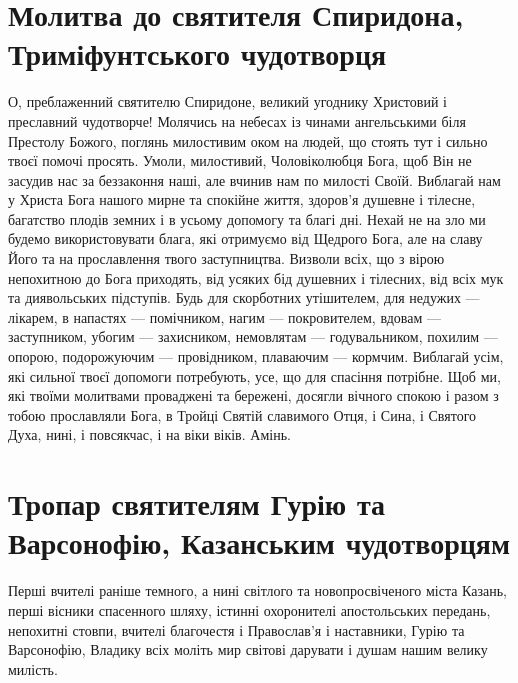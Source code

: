\documentclass[chapters.tex]{subfiles}
\begin{document}
\section{Молитва до святителя Спиридона, Триміфунтського чудотворця}
О, преблаженний святителю Спиридоне, великий угоднику Христовий і преславний чудотворче! Молячись на небесах із чинами ангельськими біля Престолу Божого, поглянь милостивим оком на людей, що стоять тут і сильно твоєї помочі просять. Умоли, милостивий, Чоловіколюбця Бога, щоб Він не засудив нас за беззаконня наші, але вчинив нам по милості Своїй. Виблагай нам у Христа Бога нашого мирне та спокійне життя, здоров’я душевне і тілесне, багатство плодів земних і в усьому допомогу та благі дні. Нехай не на зло ми будемо використовувати блага, які отримуємо від Щедрого Бога, але на славу Його та на прославлення твого заступництва. Визволи всіх, що з вірою непохитною до Бога приходять, від усяких бід душевних і тілесних, від всіх мук та диявольських підступів. Будь для скорботних утішителем, для недужих — лікарем, в напастях — помічником, нагим — покровителем, вдовам — заступником, убогим — захисником, немовлятам — годувальником, похилим — опорою, подорожуючим — провідником, плаваючим — кормчим. Виблагай усім, які сильної твоєї допомоги потребують, усе, що для спасіння потрібне. Щоб ми, які твоїми молитвами проваджені та бережені, досягли вічного спокою і разом з тобою прославляли Бога, в Тройці Святій славимого Отця, і Сина, і Святого Духа, нині, і повсякчас, і на віки віків. Амінь.

\section{Тропар святителям Гурію та Варсонофію, Казанським чудотворцям}
Перші вчителі раніше темного, а нині світлого та новопросвіченого міста Казань, перші вісники спасенного шляху, істинні охоронителі апостольських передань, непохитні стовпи, вчителі благочестя і Православ’я і наставники, Гурію та Варсонофію, Владику всіх моліть мир світові дарувати і душам нашим велику милість.
\end{document}
